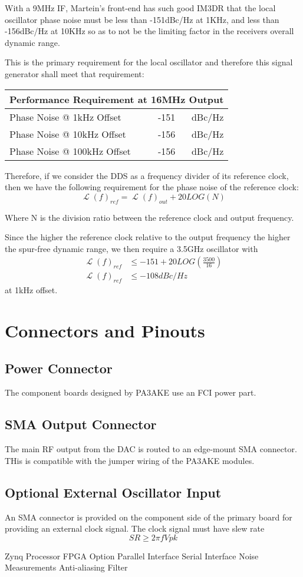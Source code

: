 \documentclass[letterpaper,12pt]{article}
\DeclareMathOperator{\Lph}{\mathscr{L}}
\begin{document}
With a 9MHz IF, Martein's front-end has such good IM3DR that the local oscillator
phase noise must be less than -151dBc/Hz at 1KHz, and less than -156dBc/Hz at 
10KHz so as to not be the limiting factor in the receivers overall dynamic range.

This is the primary requirement for the local oscillator and therefore this signal 
generator shall meet that requirement:
\begin{center}
\begin{tabular}{| l | c | r |}
\hline
\multicolumn{3}{|l|}{Performance Requirement at 16MHz Output} \\ \hline
Phase Noise @ 1kHz Offset & -151 & dBc/Hz \\ \hline
Phase Noise @ 10kHz Offset & -156 & dBc/Hz \\ \hline
Phase Noise @ 100kHz Offset & -156 & dBc/Hz \\ \hline
\end{tabular}
\end{center}

Therefore, if we consider the DDS as a frequency divider of its reference 
clock, then we have the following requirement for the phase noise of the 
reference clock:
\[
  \Lph(f)_{ref} = \Lph(f)_{out} + 20LOG(N)
\]

Where N is the division ratio between the reference clock and output frequency.

Since the higher the reference clock relative to the output frequency the
higher the spur-free dynamic range, we then require a 3.5GHz oscillator 
with 
\begin{align*}  
  \Lph(f)_{ref} &\leq -151 + 20LOG(\frac{3500}{16}) \\
  \Lph(f)_{ref} &\leq -108 dBc/Hz
\end{align*}
at 1kHz offset.


\section{Connectors and Pinouts}
\subsection{Power Connector}
The component boards designed by PA3AKE use an FCI power part.

\subsection{SMA Output Connector} 
The main RF output from the DAC is routed to an edge-mount SMA connector. 
THis is compatible with the jumper wiring of the PA3AKE modules.

\subsection{Optional External Oscillator Input}
An SMA connector is provided on the component side of the primary board 
for providing an external clock signal. The clock signal must have slew rate 
\[
  SR \geq 2\pi f  Vpk
\]

Zynq Processor FPGA Option
Parallel Interface 
Serial Interface 
Noise Measurements
Anti-aliasing Filter
\end{document}
